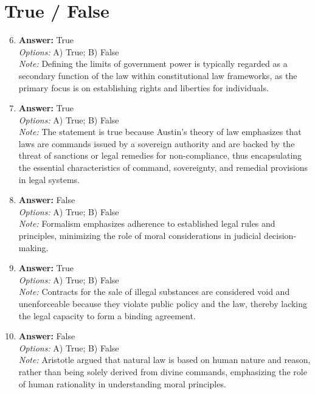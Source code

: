 \documentclass[12pt]{article}
\begin{document}
\section*{True / False}
\begin{enumerate}[label=\arabic*.]
\setcounter{enumi}{5}
\item \textbf{Answer:} True
\\ \textit{Options:} A) True; B) False
\\ \textit{Note:} Defining the limits of government power is typically regarded as a secondary function of the law within constitutional law frameworks, as the primary focus is on establishing rights and liberties for individuals.
\item \textbf{Answer:} True
\\ \textit{Options:} A) True; B) False
\\ \textit{Note:} The statement is true because Austin's theory of law emphasizes that laws are commands issued by a sovereign authority and are backed by the threat of sanctions or legal remedies for non-compliance, thus encapsulating the essential characteristics of command, sovereignty, and remedial provisions in legal systems.
\item \textbf{Answer:} False
\\ \textit{Options:} A) True; B) False
\\ \textit{Note:} Formalism emphasizes adherence to established legal rules and principles, minimizing the role of moral considerations in judicial decision-making.
\item \textbf{Answer:} True
\\ \textit{Options:} A) True; B) False
\\ \textit{Note:} Contracts for the sale of illegal substances are considered void and unenforceable because they violate public policy and the law, thereby lacking the legal capacity to form a binding agreement.
\item \textbf{Answer:} False
\\ \textit{Options:} A) True; B) False
\\ \textit{Note:} Aristotle argued that natural law is based on human nature and reason, rather than being solely derived from divine commands, emphasizing the role of human rationality in understanding moral principles.
\end{enumerate}
\end{document}
